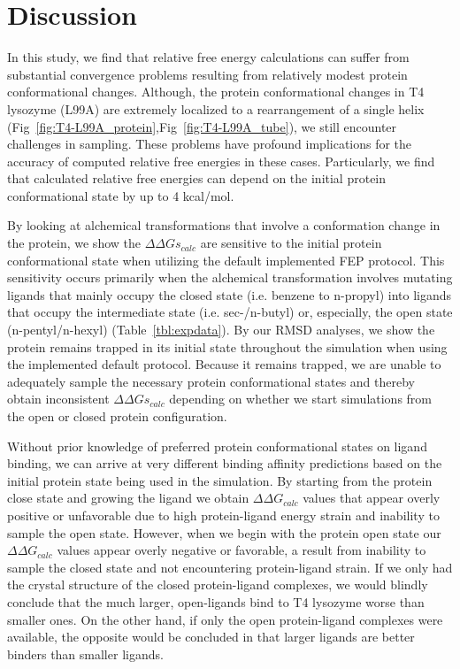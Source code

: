 \documentclass[journal=jctcce,manuscript=article]{achemso}
\begin{document}
\section{Discussion}
In this study, we find that relative free energy calculations can suffer from substantial convergence problems resulting from relatively modest protein conformational changes.
Although, the protein conformational changes in T4 lysozyme (L99A) are extremely localized to a rearrangement of a single helix (Fig~\ref{fig:T4-L99A_protein},Fig~\ref{fig:T4-L99A_tube}), we still encounter challenges in sampling.
These problems have profound implications for the accuracy of computed relative free energies in these cases.
Particularly, we find that calculated relative free energies can depend on the initial protein conformational state by up to 4 kcal/mol.

By looking at alchemical transformations that involve a conformation change in the protein, we show the $\Delta\Delta Gs_{calc}$ are sensitive to the initial protein conformational state when utilizing the default implemented FEP protocol.
This sensitivity occurs primarily when the alchemical transformation involves mutating ligands that mainly occupy the closed state (i.e. benzene to n-propyl) into ligands that occupy the intermediate state (i.e. sec-/n-butyl) or, especially, the open state (n-pentyl/n-hexyl) (Table~\ref{tbl:expdata}).
By our RMSD analyses, we show the protein remains trapped in its initial state throughout the simulation when using the implemented default protocol.
Because it remains trapped, we are unable to adequately sample the necessary protein conformational states and thereby obtain inconsistent $\Delta\Delta Gs_{calc}$ depending on whether we start simulations from the open or closed protein configuration.


Without prior knowledge of preferred protein conformational states on ligand binding, we can arrive at very different binding affinity predictions based on the initial protein state being used in the simulation.
By starting from the protein close state and growing the ligand we obtain $\Delta\Delta G_{calc}$ values that appear overly positive or unfavorable due to high protein-ligand energy strain and inability to sample the open state. 
However, when we begin with the protein open state our $\Delta\Delta G_{calc}$ values appear overly negative or favorable, a result from inability to sample the closed state and not encountering protein-ligand strain.
If we only had the crystal structure of the closed protein-ligand complexes, we would blindly conclude that the much larger, open-ligands bind to T4 lysozyme worse than smaller ones.
On the other hand, if only the open protein-ligand complexes were available, the opposite would be concluded in that larger ligands are better binders than smaller ligands.
\end{document}
